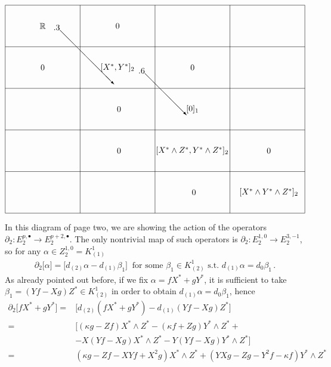 \documentclass[10pt]{amsart}
\theoremstyle{remark}
\numberwithin{equation}{section}
\begin{document}
\begin{align*}
    \begin{picture}(360,250)(0,0)
   \put(  0,  0){\line( 1, 0){360}}
   \put(  0,  0){\line( 0, 1){250}}
   \multiput(  0, 50)( 0,50){5}{\line( 1, 0){360}}
   \multiput( 90,  0)(90, 0){4}{\line( 0, 1){250}}
   \put(45,225){\makebox(0,0){$ \mathbb{R}$}}
   \put(45,175){\makebox(0,0){$ 0$}}
   \put(135,225){\makebox(0,0){$0$}}
   \put(135,175){\makebox(0,0){$ [X^\ast,Y^\ast]_2$}}
   \put(135,125){\makebox(0,0){{ $ 0$}}}
   \put(135,75){\makebox(0,0){{ $ 0$}}}
   \put(225,175){\makebox(0,0){$0$}}
   \put(225,125){\makebox(0,0){$[0]_1$}}
   \put(223,75){\makebox(0,0){{ $[X^\ast\wedge Z^\ast,Y^\ast\wedge Z^\ast]_2$}}}
   \put(225,25){\makebox(0,0){{ $ 0$}}}
   \put(315,75){\makebox(0,0){{ $0$}}}
   \put(315,25){\makebox(0,0){{ $[X^\ast\wedge Y^\ast\wedge Z^\ast]_2$}}}
   \put(58,220){\vector(1,-1.3){65}}
   \put(160,168){\vector(1,-1.6){50}}
  \end{picture} 
\end{align*}
In this diagram of page two, we are showing the action of the operators $\partial_2\colon E_2^{p,\bullet}\to E_2^{p+2,\bullet}$. The only nontrivial map of such operators is $\partial_2\colon E_2^{1,0}\to E_2^{3,-1}$, so for any $\alpha\in Z_2^{1,0}=K_{(1)}^1$ 
\begin{align*}
    \partial_2\big[\alpha\big]=\big[d_{(2)}\alpha-d_{(1)}\beta_1\big]\ \text{ for some }\beta_1\in K_{(2)}^1\text{ s.t. }d_{(1)}\alpha=d_0\beta_1\,.
\end{align*}
As already pointed out before, if we fix $\alpha=fX^\ast+g Y^\ast$, it is sufficient to take $\beta_1=(Yf-Xg)Z^\ast\in K_{(2)}^1$ in order to obtain $d_{(1)}\alpha=d_0\beta_1$, hence
\begin{align*}
    \partial_2\big[fX^\ast+gY^\ast\big]=&\big[d_{(2)}(fX^\ast+gY^\ast)-d_{(1)}(Yf-Xg)Z^\ast\big]\\=&\big[(\kappa g-Zf)X^\ast\wedge Z^\ast-(\kappa f+Zg)Y^\ast\wedge Z^\ast+\\&-X(Yf-Xg)X^\ast\wedge Z^\ast-Y(Yf-Xg)Y^\ast\wedge Z^\ast\big]\\=&(\kappa g-Zf-XYf+X^2g)X^\ast\wedge Z^\ast+(YXg-Zg-Y^2f-\kappa f)Y^\ast\wedge Z^\ast
\end{align*}
\end{document}
